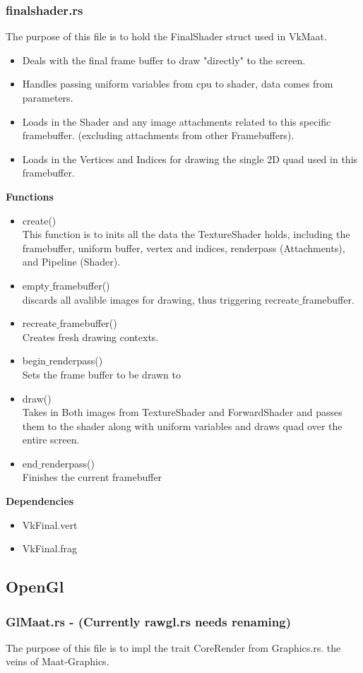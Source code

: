 \documentclass[12pt,a4paper]{article}
\begin{document}
\subsubsection{finalshader.rs}
The purpose of this file is to hold the FinalShader struct used in VkMaat.\\
\begin{itemize}
\item Deals with the final frame buffer to draw "directly" to the screen.
\item Handles passing uniform variables from cpu to shader, data comes from parameters.
\item Loads in the Shader and any image attachments related to this specific framebuffer. (excluding attachments from other Framebuffers).
\item Loads in the Vertices and Indices for drawing the single 2D quad used in this framebuffer.
\end{itemize}
\textbf{Functions}
\begin{itemize}
\item create()\\ This function is to inits all the data the TextureShader holds, including the framebuffer, uniform buffer, vertex and indices, renderpass (Attachments), and Pipeline (Shader).
\item empty$\_$framebuffer()\\ discards all avalible images for drawing, thus triggering recreate$\_$framebuffer.
\item recreate$\_$framebuffer() \\Creates fresh drawing contexts.
\item begin$\_$renderpass() \\Sets the frame buffer to be drawn to
\item draw() \\Takes in Both images from TextureShader and ForwardShader and passes them to the shader along with uniform variables and draws quad over the entire screen.
\item end$\_$renderpass()\\Finishes the current framebuffer
\end{itemize}
\textbf{Dependencies}
\begin{itemize}
\item VkFinal.vert
\item VkFinal.frag
\end{itemize}
\subsection{OpenGl}
\subsubsection{GlMaat.rs - (Currently rawgl.rs needs renaming)}
The purpose of this file is to impl the trait CoreRender from Graphics.rs. the veins of Maat-Graphics.\\
\end{document}
